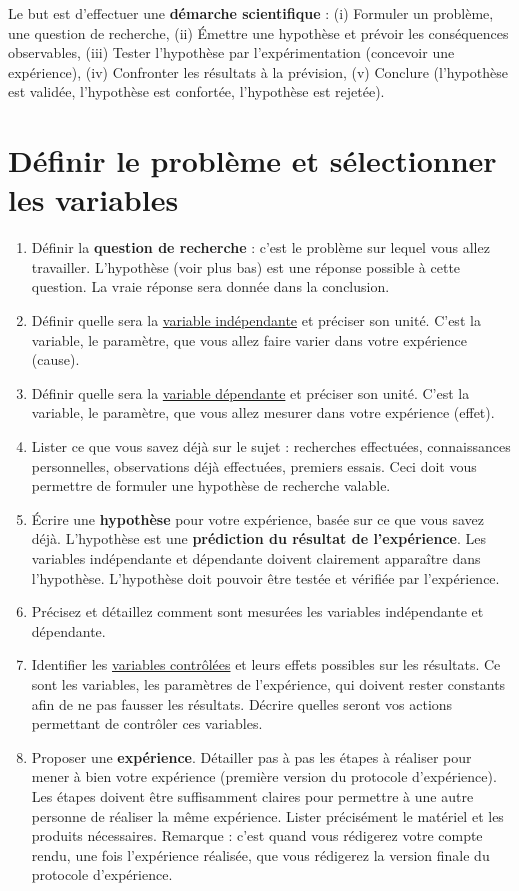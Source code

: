 
Le but est d'effectuer une \textbf{démarche scientifique} : \newline
(i) Formuler un problème, une question de recherche, (ii) Émettre une hypothèse et prévoir les conséquences observables, (iii) Tester l'hypothèse par l'expérimentation (concevoir une expérience), (iv) Confronter les résultats à la prévision, (v) Conclure (l'hypothèse est validée, l'hypothèse est confortée, l'hypothèse est rejetée).

\section{Définir le problème et sélectionner les variables}  


\begin{enumerate}
\item Définir la \textbf{question de recherche} : c'est le problème sur lequel vous allez travailler. L'hypothèse (voir plus bas) est une réponse possible à cette question. La vraie réponse sera donnée dans la conclusion.
%
\item Définir quelle sera la \underline{variable indépendante} et préciser son unité. C'est la variable, le paramètre, que vous allez faire varier dans votre expérience (cause).
%
\item Définir quelle sera la \underline{variable dépendante} et préciser son unité. C'est la variable, le paramètre, que vous allez mesurer dans votre expérience (effet).
%
\item Lister ce que vous savez déjà sur le sujet : recherches effectuées, connaissances personnelles, observations déjà effectuées, premiers essais. Ceci doit vous permettre de formuler une hypothèse de recherche valable.
%
\item Écrire une \textbf{hypothèse} pour votre expérience, basée sur ce que vous savez déjà. L'hypothèse est une \textbf{prédiction du résultat de l'expérience}. Les variables indépendante et dépendante doivent clairement apparaître dans l'hypothèse. L'hypothèse doit pouvoir être testée et vérifiée par l'expérience.
%
\item Précisez et détaillez comment sont mesurées les variables indépendante et dépendante.
%
\item Identifier les \underline{variables contrôlées} et leurs effets possibles sur les résultats. Ce sont les variables, les paramètres de l'expérience, qui doivent rester constants afin de ne pas fausser les résultats. Décrire quelles seront vos actions permettant de contrôler ces variables. 
%
\item Proposer une \textbf{expérience}. Détailler pas à pas les étapes à réaliser pour mener à bien votre expérience (première version du protocole d'expérience). Les étapes doivent être suffisamment claires pour permettre à une autre personne de réaliser la même expérience. Lister précisément le matériel et les produits nécessaires. Remarque : c'est quand vous rédigerez votre compte rendu, une fois l'expérience réalisée, que vous rédigerez la version finale du protocole d'expérience.
%
\end{enumerate}

